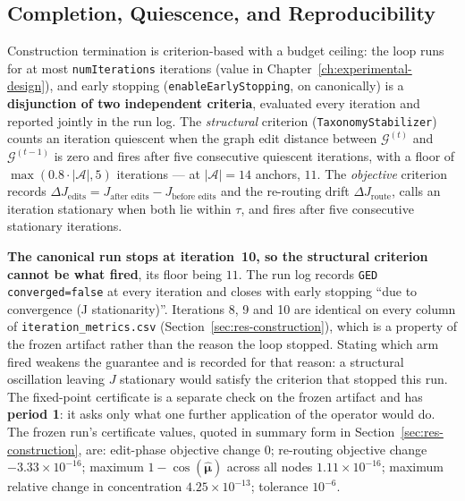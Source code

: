 \subsection{Completion, Quiescence, and Reproducibility}\label{subsec:quiescence}

Construction termination is criterion-based with a budget ceiling: the loop runs for at
most \texttt{numIterations} iterations (value in Chapter~\ref{ch:experimental-design}),
and early stopping (\texttt{enableEarlyStopping}, on canonically) is a
\textbf{disjunction of two independent criteria}, evaluated every iteration and reported
jointly in the run log.
The \emph{structural} criterion (\texttt{TaxonomyStabilizer}) counts an iteration
quiescent when the graph edit distance between $\mathcal{G}^{(t)}$ and
$\mathcal{G}^{(t-1)}$ is zero and fires after five consecutive quiescent iterations,
with a floor of $\max(0.8 \cdot |\mathcal{A}|, 5)$ iterations --- at
$|\mathcal{A}| = 14$ anchors, $11$.
The \emph{objective} criterion records
$\Delta J_{\text{edits}} = J_{\text{after edits}} - J_{\text{before edits}}$ and the
re-routing drift $\Delta J_{\text{route}}$, calls an iteration stationary when both lie
within $\tau$, and fires after five consecutive stationary iterations.

\textbf{The canonical run stops at iteration~10, so the structural criterion cannot be
what fired}, its floor being $11$. The run log records \texttt{GED converged=false} at
every iteration and closes with early stopping ``due to convergence (J stationarity)''.
Iterations 8, 9 and 10 are identical on every column of
\texttt{iteration\_metrics.csv} (Section~\ref{sec:res-construction}), which is a property
of the frozen artifact rather than the reason the loop stopped. Stating which arm fired
weakens the guarantee and is recorded for that reason: a structural oscillation leaving
$J$ stationary would satisfy the criterion that stopped this run.
The fixed-point certificate is a separate check on the frozen artifact and has
\textbf{period 1}: it asks only what one further application of the operator would do.
The frozen run's certificate values, quoted in summary form in
Section~\ref{sec:res-construction}, are: edit-phase objective change $0$; re-routing
objective change $-3.33 \times 10^{-16}$; maximum $1 - \cos(\hat{\boldsymbol{\mu}})$
across all nodes $1.11 \times 10^{-16}$; maximum relative change in concentration
$4.25 \times 10^{-13}$; tolerance $10^{-6}$.


